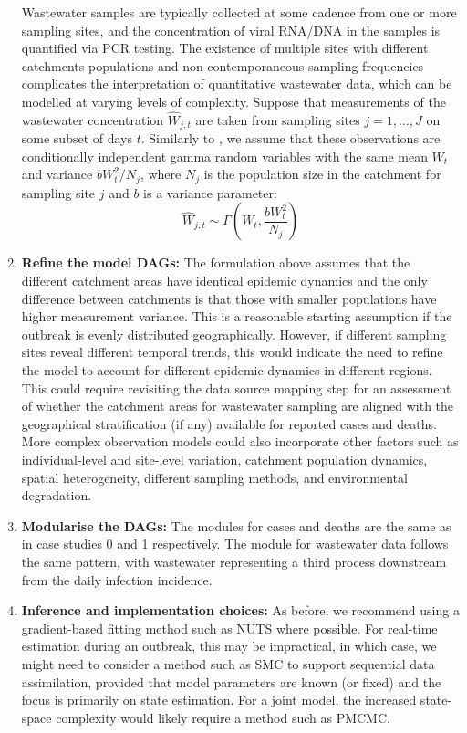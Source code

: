 \documentclass{article}
\begin{document}
\begin{enumerate}
   Wastewater samples are typically collected at some cadence from one or more sampling sites, and the concentration of viral RNA/DNA in the samples is quantified via PCR testing. The existence of multiple sites with different catchments populations and non-contemporaneous sampling frequencies complicates the interpretation of quantitative wastewater data, which can be modelled at varying levels of complexity.   
   Suppose that measurements of the wastewater concentration $\hat{W}_{j,t}$ are taken from sampling sites $j=1,\ldots, J$ on some subset of days $t$. Similarly to \citep{watson2024jointly}, we assume that these observations are conditionally independent gamma random variables with the same mean $W_t$ and variance $b W_t^2/N_j$, where $N_j$ is the population size in the catchment for sampling site $j$ and $b$ is a variance parameter:
    \begin{equation}
        \hat{W}_{j,t} \sim \Gamma\left( W_t,  \frac{b W_t^2}{N_j} \right)
    \end{equation}

       
\item \textbf{Refine the model DAGs:}  The formulation above assumes that the different catchment areas have identical epidemic dynamics and the only difference between catchments is that those with smaller populations have higher measurement variance. This is a reasonable starting assumption if the outbreak is evenly distributed geographically. However, if different sampling sites reveal different temporal trends, this would indicate the need to refine the model to account for different epidemic dynamics in different regions. This could require revisiting the data source mapping step for an assessment of whether the catchment areas for wastewater sampling are aligned with the geographical stratification (if any) available for reported cases and deaths. More complex observation models could also incorporate other factors such as individual-level and site-level variation, catchment population dynamics, spatial heterogeneity, different sampling methods, and environmental degradation.

\item \textbf{Modularise the DAGs:} The modules for cases and deaths are the same as in case studies 0 and 1 respectively. The module for wastewater data follows the same pattern, with wastewater representing a third process downstream from the daily infection incidence.
    
    \item \textbf{Inference and implementation choices:} As before, we recommend using a gradient-based fitting method such as NUTS where possible. For real-time estimation during an outbreak, this may be impractical, in which case, we might need to consider a method such as SMC to support sequential data assimilation, provided that model parameters are known (or fixed) and the focus is primarily on state estimation.  For a joint model, the increased state-space complexity would likely require a method such as PMCMC.


\end{enumerate}
\end{document}
